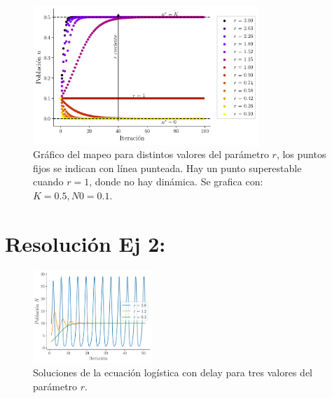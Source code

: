 \documentclass[twocolumn,aps,prl]{revtex4-1}
\begin{document}
\begin{figure}[ht!]  
    \centering
        \centering 
        \includegraphics[width = 0.76\textwidth]{scripts/ex1.pdf}
        \caption{Gráfico del mapeo para distintos valores del parámetro $r$, los puntos fijos se indican con línea punteada. Hay un punto superestable cuando $r=1$, donde no hay dinámica. Se grafica con: $K = 0.5,N0 = 0.1$.}
        \label{fig:scripts/ex1}
\end{figure}

% 

\section{Resolución Ej 2:}

\begin{figure}[ht!]
    \centering
        \centering
        \includegraphics[width = 0.4\textwidth]{scripts/ex2-cosa.pdf}
        \caption{Soluciones de la ecuación logística con delay para tres valores del parámetro $r$.}
        \label{fig:scripts/ex2-cosa}
\end{figure}
\end{document}
